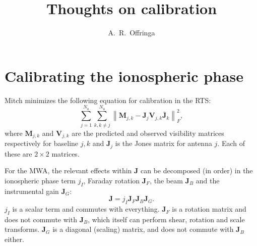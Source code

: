 \documentclass[a4paper,11pt]{article}
\title{Thoughts on calibration}
\author{A.~R.~Offringa}
\begin{document}
\label{firstpage}
\maketitle

\section{Calibrating the ionospheric phase}
Mitch minimizes the following equation for calibration in the RTS:
\begin{equation}
\sum\limits_{j=1}^{N_a} \sum\limits_{k,k\neq j}^{N_a} \left\| \mathbf{M}_{j,k} - \mathbf{J}_j \mathbf{V}_{j,k} \overline{\mathbf{J}}_k \right\|^2_F,
\end{equation}
where $\mathbf{M}_{j,k}$ and $\mathbf{V}_{j,k}$ are the predicted and observed visibility matrices respectively for baseline $j,k$ and $\mathbf{J}_j$ is the Jones matrix for antenna $j$. Each of these are $2\times 2$ matrices.

For the MWA, the relevant effects within $\mathbf{J}$ can be decomposed (in order) in the ionospheric phase term $j_I$, Faraday rotation $\mathbf{J}_F$, the beam $\mathbf{J}_B$ and the instrumental gain $\mathbf{J}_G$:
\begin{equation}
 \mathbf{J} = j_I \mathbf{J}_F \mathbf{J}_B \mathbf{J}_G.
\end{equation}
$j_I$ is a scalar term and commutes with everything. $\mathbf{J}_F$ is a rotation matrix and does not commute with $\mathbf{J}_B$, which itself can perform shear, rotation and scale transforms. $\mathbf{J}_G$ is a diagonal (scaling) matrix, and does not commute with $\mathbf{J}_B$ either.
\end{document}
